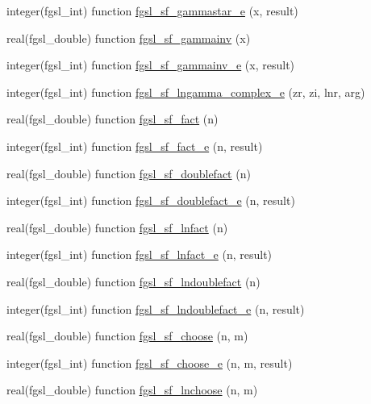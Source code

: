 \begin{DoxyCompactItemize}
\item 
integer(fgsl\+\_\+int) function \hyperlink{specfunc_8finc_a697a45fa47f4ead4ff604d24d1ef3290}{fgsl\+\_\+sf\+\_\+gammastar\+\_\+e} (x, result)
\item 
real(fgsl\+\_\+double) function \hyperlink{specfunc_8finc_a5a0962bf114d408c81b897b2ca2ee2de}{fgsl\+\_\+sf\+\_\+gammainv} (x)
\item 
integer(fgsl\+\_\+int) function \hyperlink{specfunc_8finc_a363fd577d026f303770994c868fabead}{fgsl\+\_\+sf\+\_\+gammainv\+\_\+e} (x, result)
\item 
integer(fgsl\+\_\+int) function \hyperlink{specfunc_8finc_aca9a851c2395f976dece945be9e0f590}{fgsl\+\_\+sf\+\_\+lngamma\+\_\+complex\+\_\+e} (zr, zi, lnr, arg)
\item 
real(fgsl\+\_\+double) function \hyperlink{specfunc_8finc_ab03fa6d812137aa04d0ca36921fd159e}{fgsl\+\_\+sf\+\_\+fact} (n)
\item 
integer(fgsl\+\_\+int) function \hyperlink{specfunc_8finc_ad79b4ad84aa27db38dec1c03c406198b}{fgsl\+\_\+sf\+\_\+fact\+\_\+e} (n, result)
\item 
real(fgsl\+\_\+double) function \hyperlink{specfunc_8finc_afe9f831cfcd997212fbd82604c0ac4d8}{fgsl\+\_\+sf\+\_\+doublefact} (n)
\item 
integer(fgsl\+\_\+int) function \hyperlink{specfunc_8finc_a4a3f40584ccc4237ad1ad6c849fe9e57}{fgsl\+\_\+sf\+\_\+doublefact\+\_\+e} (n, result)
\item 
real(fgsl\+\_\+double) function \hyperlink{specfunc_8finc_a4b7229cc02a457d012f56e0e67cfe206}{fgsl\+\_\+sf\+\_\+lnfact} (n)
\item 
integer(fgsl\+\_\+int) function \hyperlink{specfunc_8finc_a81a651d61889020c1d9960f5df422c61}{fgsl\+\_\+sf\+\_\+lnfact\+\_\+e} (n, result)
\item 
real(fgsl\+\_\+double) function \hyperlink{specfunc_8finc_a673eb36e50bde3322bd3579a0689fd23}{fgsl\+\_\+sf\+\_\+lndoublefact} (n)
\item 
integer(fgsl\+\_\+int) function \hyperlink{specfunc_8finc_a3d0c83939347006a120f91d4a1a31818}{fgsl\+\_\+sf\+\_\+lndoublefact\+\_\+e} (n, result)
\item 
real(fgsl\+\_\+double) function \hyperlink{specfunc_8finc_afb59552f4c03d4ca967861276ee330af}{fgsl\+\_\+sf\+\_\+choose} (n, m)
\item 
integer(fgsl\+\_\+int) function \hyperlink{specfunc_8finc_a2ea70000ea563e0e5b88d33ec5a28225}{fgsl\+\_\+sf\+\_\+choose\+\_\+e} (n, m, result)
\item 
real(fgsl\+\_\+double) function \hyperlink{specfunc_8finc_a21b8069a2cd450ab9d95ae8677d0ddf8}{fgsl\+\_\+sf\+\_\+lnchoose} (n, m)

\end{DoxyCompactItemize}
